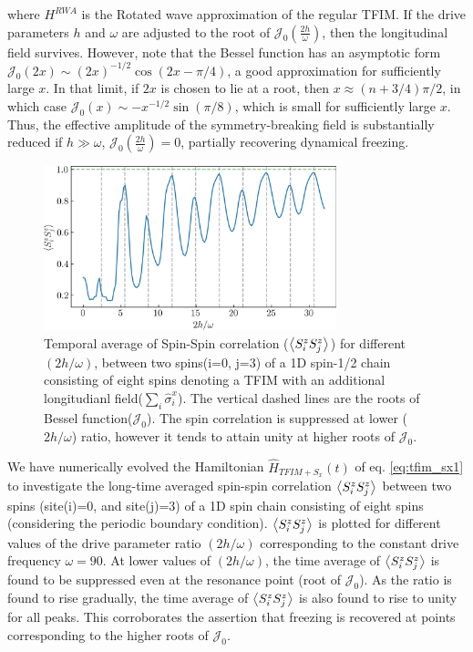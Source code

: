 \documentclass[aps,prb,reprint,showpacs,floatfix,superscriptaddress, onecolumn, nofootinbib, 9pt]{revtex4-2}
\begin{document}
\begin{enumerate}
{\begin{equation}
			\label{eq:tfim_sx1}
		\end{equation}
		where $H^{RWA}$ is the Rotated wave approximation of the regular TFIM. If the drive parameters $h$ and $\omega$ are adjusted to the root of $\mathcal{J}_0\left(\frac{2h}{\omega}\right)$, then the longitudinal field survives. However, note that the Bessel function has an asymptotic form $\mathcal{J}_0(2x)\sim (2x)^{-1/2}\cos(2x-\pi/4)$, a good approximation for sufficiently large $x$. In that limit, if $2x$ is chosen to lie at a root, then $x\approx (n+3/4)\pi/2$, in which case $\mathcal{J}_0(x) \sim -x^{-1/2}\sin{\left(\pi/8\right)}$, which is small for sufficiently large $x$. Thus, the effective amplitude of the symmetry-breaking field  is substantially reduced if $h\gg\omega$, $\mathcal{J}_0\left(\frac{2h}{\omega}\right)=0$, partially recovering dynamical freezing.
		\begin{figure}[h!]
			\includegraphics[width=8.5cm]{corrN8sz0sz3avg_onlynn_tfim_sx.jpeg}
			\caption{Temporal average of Spin-Spin correlation ($\expval{S^z_i S^z_j}$) for different $(2h/\omega)$, between two spins(i=0, j=3) of a 1D spin-1/2 chain consisting of eight spins denoting a TFIM with an additional longitudianl field($\sum_i\hat{\sigma}^x_i$).  The  vertical dashed lines are the roots of Bessel function($\mathcal{J}_0$). The spin correlation is suppressed at lower ($2h/\omega$) ratio, however it tends to attain unity at higher roots of $\mathcal{J}_0$.}
				\label{fig:TFIM_sx}
			\end{figure}
			
			We have numerically evolved the Hamiltonian $\hat{H}_{TFIM+S_x}(t)$ of eq. \eqref{eq:tfim_sx1} to investigate the long-time averaged spin-spin correlation $\expval{S^z_i S^z_{j}}$ between two spins (site(i)=0, and site(j)=3) of a 1D spin chain consisting of eight spins (considering the periodic boundary condition).  $\expval{S^z_i S^z_{j}}$ is plotted for different values of the drive parameter ratio $(2h/\omega)$ corresponding to the constant drive frequency $\omega=90$. At lower values of $(2h/\omega)$, the time average of $\expval{S^z_i S^z_{j}}$ is found to be suppressed even at the resonance point (root of $\mathcal{J}_0$). As the ratio is found to rise gradually, the time average of $\expval{S^z_i S^z_{j}}$ is also found to rise to unity for all peaks. This corroborates the assertion that freezing is recovered at points corresponding to the higher roots of $\mathcal{J}_0$.
		}
		

\end{enumerate}
\end{document}
